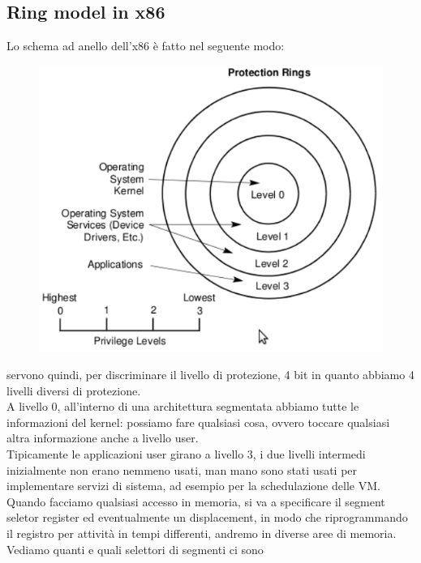 \documentclass[12pt, oneside]{extbook}
\begin{document}
\subsection{Ring model in x86}
Lo schema ad anello dell'x86 è fatto nel seguente modo:
\begin{figure}[!h]
	\includegraphics[scale=0.3]{immagini/ring_x86.png}
\end{figure}
servono quindi, per discriminare il livello di protezione, 4 bit in quanto abbiamo 4 livelli diversi di protezione.\\A livello 0, all'interno di una architettura segmentata abbiamo tutte le informazioni del kernel: possiamo fare qualsiasi cosa, ovvero toccare qualsiasi altra informazione anche a livello user.\\ Tipicamente le applicazioni user girano a livello 3, i due livelli intermedi inizialmente non erano nemmeno usati, man mano sono stati usati per implementare servizi di sistema, ad esempio per la schedulazione delle VM.\\ Quando facciamo qualsiasi accesso in memoria, si va a specificare il segment seletor register ed eventualmente un displacement, in modo che riprogrammando il registro per attività in tempi differenti, andremo in diverse aree di memoria. Vediamo quanti e quali selettori di segmenti ci sono
\end{document}
